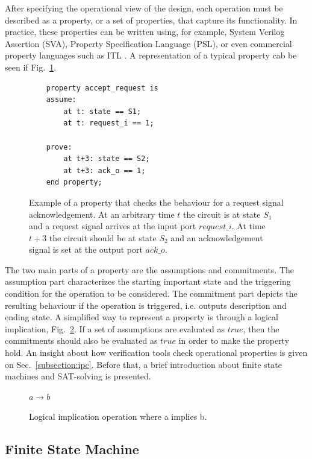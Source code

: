 After specifying the operational view of the design, each operation must be described as a property, or a set of properties, that capture its functionality. In practice, these properties can be written using, for example, System Verilog Assertion (SVA), Property Specification Language (PSL), or even commercial property languages such as ITL \cite{onespin}. A representation of a typical property cab be seen if Fig.~\ref{fig:property}.

\begin{figure}[htb!]
    \begin{lstlisting}
    property accept_request is
    assume:
        at t: state == S1;
        at t: request_i == 1;
    
    prove:
        at t+3: state == S2;
        at t+3: ack_o == 1;
    end property;
    \end{lstlisting}
    \caption{Example of a property that checks the behaviour for a request signal acknowledgement. At an arbitrary time $t$ the circuit is at state $S_1$ and a request signal arrives at the input port $request\_i$. At time $t+3$ the circuit should be at state $S_2$ and an acknowledgement signal is set at the output port $ack\_o$.}
    \label{fig:property}
\end{figure}

The two main parts of a property are the assumptions and commitments. The assumption part characterizes the starting important state and the triggering condition for the operation to be considered. The commitment part depicts the resulting behaviour if the operation is triggered, i.e. outputs description and ending state. A simplified way to represent a property is through a logical implication, Fig.~\ref{fig:a_impl_b}. If a set of assumptions are evaluated as $true$, then the commitments should also be evaluated as $true$ in order to make the property hold. An insight about how verification tools check operational properties is given on Sec.~\ref{subsection:ipc}. Before that, a brief introduction about finite state machines and SAT-solving is presented.

\begin{figure}[htb!]
    \begin{center}
        $a \longrightarrow b$
    \end{center}
    \caption{Logical implication operation where a implies b.}
    \label{fig:a_impl_b}
\end{figure}

\subsection*{Finite State Machine}

